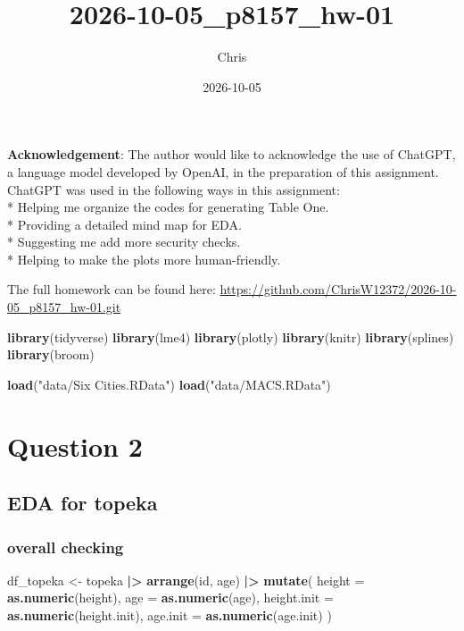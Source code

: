 \documentclass[
]{article}
\title{2026-10-05\_p8157\_hw-01}
\author{Chris}
\date{2026-10-05}
\newenvironment{Shaded}{\begin{snugshade}}{\end{snugshade}}
\newcommand{\AttributeTok}[1]{\textcolor[rgb]{0.13,0.29,0.53}{#1}}
\newcommand{\FunctionTok}[1]{\textcolor[rgb]{0.13,0.29,0.53}{\textbf{#1}}}
\newcommand{\NormalTok}[1]{#1}
\newcommand{\OtherTok}[1]{\textcolor[rgb]{0.56,0.35,0.01}{#1}}
\newcommand{\SpecialCharTok}[1]{\textcolor[rgb]{0.81,0.36,0.00}{\textbf{#1}}}
\newcommand{\StringTok}[1]{\textcolor[rgb]{0.31,0.60,0.02}{#1}}
\begin{document}
\maketitle

\textbf{Acknowledgement}: The author would like to acknowledge the use
of ChatGPT, a language model developed by OpenAI, in the preparation of
this assignment. ChatGPT was used in the following ways in this
assignment:\\
* Helping me organize the codes for generating Table One.\\
* Providing a detailed mind map for EDA.\\
* Suggesting me add more security checks.\\
* Helping to make the plots more human-friendly.

The full homework can be found here:
\url{https://github.com/ChrisW12372/2026-10-05_p8157_hw-01.git}

\begin{Shaded}
\begin{Highlighting}[]
\FunctionTok{library}\NormalTok{(tidyverse)}
\FunctionTok{library}\NormalTok{(lme4)}
\FunctionTok{library}\NormalTok{(plotly)}
\FunctionTok{library}\NormalTok{(knitr)}
\FunctionTok{library}\NormalTok{(splines)}
\FunctionTok{library}\NormalTok{(broom)}

\FunctionTok{load}\NormalTok{(}\StringTok{"data/Six Cities.RData"}\NormalTok{)}
\FunctionTok{load}\NormalTok{(}\StringTok{"data/MACS.RData"}\NormalTok{)}
\end{Highlighting}
\end{Shaded}

\section{Question 2}\label{question-2}

\subsection{EDA for topeka}\label{eda-for-topeka}

\subsubsection{overall checking}\label{overall-checking}

\begin{Shaded}
\begin{Highlighting}[]
\NormalTok{df\_topeka }\OtherTok{\textless{}{-}}\NormalTok{ topeka }\SpecialCharTok{|\textgreater{}}
  \FunctionTok{arrange}\NormalTok{(id, age) }\SpecialCharTok{|\textgreater{}}
  \FunctionTok{mutate}\NormalTok{(}
    \AttributeTok{height =} \FunctionTok{as.numeric}\NormalTok{(height),}
    \AttributeTok{age =} \FunctionTok{as.numeric}\NormalTok{(age),}
    \AttributeTok{height.init =} \FunctionTok{as.numeric}\NormalTok{(height.init),}
    \AttributeTok{age.init =} \FunctionTok{as.numeric}\NormalTok{(age.init)}
\NormalTok{  )}
\end{Highlighting}
\end{Shaded}
\end{document}
